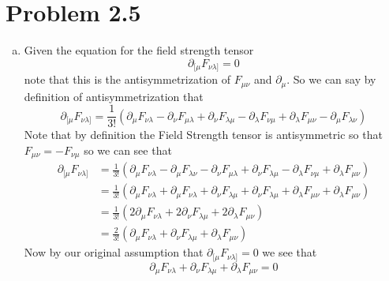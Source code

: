\documentclass[11pt]{article}
\numberwithin{equation}{section}
\begin{document}
\section{Problem 2.5}
\begin{enumerate}[(a)]
\item
Given the equation for the field strength tensor 
$$\partial_{[\mu}F_{\nu\lambda]} = 0$$
note that this is the antisymmetrization of $F_{\mu\nu}$ and $\partial_{\mu}$. So we can say by definition of antisymmetrization that
$$\partial_{[\mu}F_{\nu\lambda]} = \frac{1}{3!}\left(\partial_{\mu}F_{\nu\lambda} - \partial_{\nu}F_{\mu\lambda} + \partial_{\nu}F_{\lambda\mu} - \partial_{\lambda}F_{\nu\mu} + \partial_{\lambda}F_{\mu\nu} - \partial_{\mu}F_{\lambda\nu}\right)$$
Note that by definition the Field Strength tensor is antisymmetric so that $F_{\mu\nu} = -F_{\nu\mu}$ so we can see that
\begin{align*}
\partial_{[\mu}F_{\nu\lambda]} &= \frac{1}{3!}\left(\partial_{\mu}F_{\nu\lambda}- \partial_{\mu}F_{\lambda\nu} - \partial_{\nu}F_{\mu\lambda} + \partial_{\nu}F_{\lambda\mu} - \partial_{\lambda}F_{\nu\mu} + \partial_{\lambda}F_{\mu\nu} \right)\\
&= \frac{1}{3!}\left(\partial_{\mu}F_{\nu\lambda}+ \partial_{\mu}F_{\nu\lambda} + \partial_{\nu}F_{\lambda\mu} + \partial_{\nu}F_{\lambda\mu} + \partial_{\lambda}F_{\mu\nu} + \partial_{\lambda}F_{\mu\nu} \right)\\
&= \frac{1}{3!}\left(2\partial_{\mu}F_{\nu\lambda} + 2\partial_{\nu}F_{\lambda\mu} + 2\partial_{\lambda}F_{\mu\nu} \right)\\
&= \frac{2}{3!}\left(\partial_{\mu}F_{\nu\lambda} + \partial_{\nu}F_{\lambda\mu} + \partial_{\lambda}F_{\mu\nu} \right)
\end{align*}
Now by our original assumption that $\partial_{[\mu}F_{\nu\lambda]}=0$ we see that
$$\partial_{\mu}F_{\nu\lambda} + \partial_{\nu}F_{\lambda\mu} + \partial_{\lambda}F_{\mu\nu} =0 $$


\end{enumerate}
\end{document}
